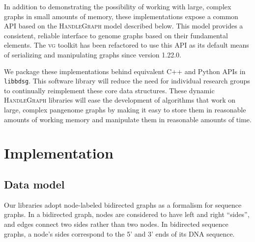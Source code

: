 \documentclass{article}
\begin{document}
In addition to demonstrating the possibility of working with large, complex graphs in small amounts of memory, these implementations expose a common API based on the \textsc{HandleGraph} model described below.
This model provides a consistent, reliable interface to genome graphs based on their fundamental elements.
The \textsc{vg} toolkit has been refactored to use this API as its default means of serializing and manipulating graphs since version 1.22.0. 

We package these implementations behind equivalent C++ and Python APIs in \texttt{libbdsg}.
This software library will reduce the need for individual research groups to continually reimplement these core data structures.
These dynamic \textsc{HandleGraph} libraries will ease the development of algorithms that work on large, complex pangenome graphs by making it easy to store them in reasonable amounts of working memory and manipulate them in reasonable amounts of time.




\section{Implementation}

\subsection{Data model}

Our libraries adopt node-labeled bidirected graphs as a formalism for sequence graphs.
In a bidirected graph, nodes are considered to have left and right ``sides'', and edges connect two sides rather than two nodes.
In bidirected sequence graphs, a node's sides correspond to the 5' and 3' ends of its DNA sequence. 
\end{document}

